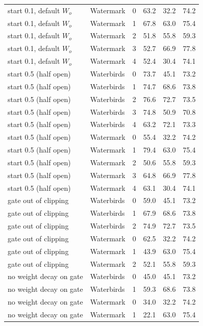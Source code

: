 \documentclass[10pt]{article}
\begin{document}
\begin{longtable}{llrrrr}
start 0.1, default $W_o$ & Watermark & 0 & 63.2 & 32.2 & 74.2 \\
start 0.1, default $W_o$ & Watermark & 1 & 67.8 & 63.0 & 75.4 \\
start 0.1, default $W_o$ & Watermark & 2 & 51.8 & 55.8 & 59.3 \\
start 0.1, default $W_o$ & Watermark & 3 & 52.7 & 66.9 & 77.8 \\
start 0.1, default $W_o$ & Watermark & 4 & 52.4 & 30.4 & 74.1 \\
start 0.5 (half open) & Waterbirds & 0 & 73.7 & 45.1 & 73.2 \\
start 0.5 (half open) & Waterbirds & 1 & 74.7 & 68.6 & 73.8 \\
start 0.5 (half open) & Waterbirds & 2 & 76.6 & 72.7 & 73.5 \\
start 0.5 (half open) & Waterbirds & 3 & 74.8 & 50.9 & 70.8 \\
start 0.5 (half open) & Waterbirds & 4 & 63.2 & 72.1 & 73.3 \\
start 0.5 (half open) & Watermark & 0 & 55.4 & 32.2 & 74.2 \\
start 0.5 (half open) & Watermark & 1 & 79.4 & 63.0 & 75.4 \\
start 0.5 (half open) & Watermark & 2 & 50.6 & 55.8 & 59.3 \\
start 0.5 (half open) & Watermark & 3 & 64.8 & 66.9 & 77.8 \\
start 0.5 (half open) & Watermark & 4 & 63.1 & 30.4 & 74.1 \\
gate out of clipping & Waterbirds & 0 & 59.0 & 45.1 & 73.2 \\
gate out of clipping & Waterbirds & 1 & 67.9 & 68.6 & 73.8 \\
gate out of clipping & Waterbirds & 2 & 74.9 & 72.7 & 73.5 \\
gate out of clipping & Watermark & 0 & 62.5 & 32.2 & 74.2 \\
gate out of clipping & Watermark & 1 & 43.9 & 63.0 & 75.4 \\
gate out of clipping & Watermark & 2 & 52.1 & 55.8 & 59.3 \\
no weight decay on gate & Waterbirds & 0 & 45.0 & 45.1 & 73.2 \\
no weight decay on gate & Waterbirds & 1 & 59.3 & 68.6 & 73.8 \\
no weight decay on gate & Watermark & 0 & 34.0 & 32.2 & 74.2 \\
no weight decay on gate & Watermark & 1 & 22.1 & 63.0 & 75.4 \\
\bottomrule
\end{longtable}
\end{document}
